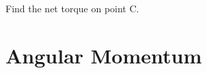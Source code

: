 %
%
%
%
\begin{example}
  Find the net torque on point C.
\end{example}




\section{Angular Momentum}

